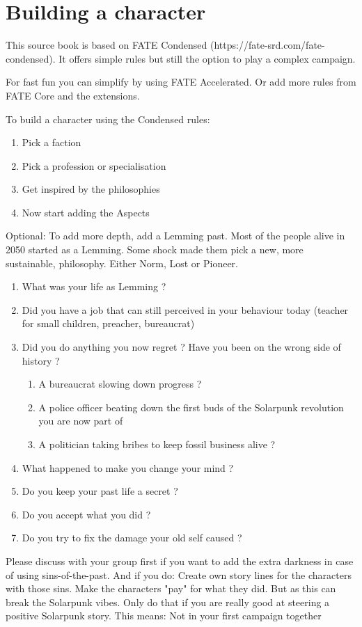\chapter{Building a character}

This source book is based on FATE Condensed (https://fate-srd.com/fate-condensed). It offers simple rules but still the option to play a complex campaign.

For fast fun you can simplify by using FATE Accelerated.
Or add more rules from FATE Core and the extensions.

To build a character using the Condensed rules:

\begin{enumerate}
    \item Pick a faction
    \item Pick a profession or specialisation
    \item Get inspired by the philosophies
    \item Now start adding the Aspects
\end{enumerate}

Optional: To add more depth, add a Lemming past. Most of the people alive in 2050 started as a Lemming. Some shock made them pick a new, more sustainable, philosophy. Either Norm, Lost or Pioneer.

\begin{enumerate}
    \item What was your life as Lemming ?
    \item Did you have a job that can still perceived in your behaviour today (teacher for small children, preacher, bureaucrat)
    \item Did you do anything you now regret ? Have you been on the wrong side of history ?
    \begin{enumerate}
        \item A bureaucrat slowing down progress ?
        \item A police officer beating down the first buds of the Solarpunk revolution you are now part of
        \item A politician taking bribes to keep fossil business alive ?
    \end{enumerate}
    \item What happened to make you change your mind ?
    \item Do you keep your past life a secret ?
    \item Do you accept what you did ?
    \item Do you try to fix the damage your old self caused ?
\end{enumerate}

Please discuss with your group first if you want to add the extra darkness in case of using sins-of-the-past. And if you do: Create own story lines for the characters with those sins. Make the characters "pay" for what they did. But as this can break the Solarpunk vibes. Only do that if you are really good at steering a positive Solarpunk story. This means: Not in your first campaign together